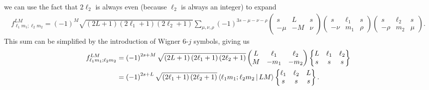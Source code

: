 \documentclass[notitlepage,twocolumn]{revtex4-2}
\newcommand{\p}[1]{\left(#1\right)} %
\newcommand{\bk}{\Braket} %
\begin{document}
we can use the fact that $2\ell_2$ is always even (because $\ell_2$ is always an integer) to expand
\begin{align}
  f_{\ell_1 m_1;\ell_2 m_2}^{LM}
  = \p{-1}^M \sqrt{\p{2L+1}\p{2\ell_1+1}\p{2\ell_2+1}}
  \sum_{\mu,\nu,\rho} \p{-1}^{3s-\mu-\nu-\rho}
  \begin{pmatrix}
    s & L & s \\
    -\mu & -M & \nu
  \end{pmatrix}
  \begin{pmatrix}
    s & \ell_1 & s \\
    -\nu & m_1 & \rho
  \end{pmatrix}
  \begin{pmatrix}
    s & \ell_2 & s \\
    -\rho & m_2 & \mu
  \end{pmatrix}.
\end{align}
This sum can be simplified by the introduction of Wigner 6-$j$ symbols, giving us
\begin{align}
  f_{\ell_1 m_1;\ell_2 m_2}^{LM}
  &= \p{-1}^{2s+M} \sqrt{\p{2L+1}\p{2\ell_1+1}\p{2\ell_2+1}}
  \begin{pmatrix}
    L & \ell_1 & \ell_2 \\
    M & -m_1 & -m_2
  \end{pmatrix}
  \begin{Bmatrix}
    L & \ell_1 & \ell_2 \\
    s & s & s
  \end{Bmatrix} \\
  &= \p{-1}^{2s+L} \sqrt{\p{2\ell_1+1}\p{2\ell_2+1}}
  \bk{\ell_1 m_1; \ell_2 m_2| LM}
  \begin{Bmatrix}
    \ell_1 & \ell_2 & L \\
    s & s & s
  \end{Bmatrix}.
\end{align}
\end{document}
